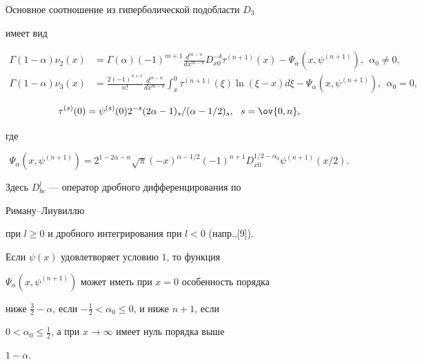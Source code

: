 \begin{lem} 


Основное соотношение из гиперболической подобласти $D_3$ 


имеет вид 


\begin{align*} 


\Gamma(1-\alpha)\nu_2(x)&=\Gamma(\alpha)(-1)^{m+1} 


\frac{d^{m-n}}{dx^{m-n}}D^{-\delta}_{x0}\tau^{(n+1)}(x) 


-\Psi_\alpha(x,\psi^{(n+1)}),\ \ \alpha_0\ne0,\\ 


% 


\Gamma(1-\alpha)\nu_3(x)&=\frac{2(-1)^{n+1}}{n!} 


\frac{d^{m-n}}{dx^{m-n}}\int^0_x \tau^{(n+1)}(\xi) 


\ln(\xi-x)d\xi-\Psi_\alpha(x,\psi^{(n+1)}),\ \ \alpha_0=0, 


\end{align*} 


$$ 


\tau^{(s)}(0)=\psi^{(s)}(0)2^{-s}(2\alpha-1)_s/(\alpha-1/2)_s, 


\ \ s=\ov{0,n}, 


$$ 


где 


$$ 


\Psi_\alpha(x,\psi^{(n+1)})=2^{1-2\alpha-n} 


\sqrt{\pi}(-x)^{\alpha-1/2}(-1)^{n+1} 


D^{1/2-\alpha_0}_{x0}\psi^{(n+1)}(x/2). 


$$ 


\end{lem} 


 


Здесь $D^l_{bc}$ --- оператор дробного дифференцирования по 


Риману--Лиувиллю 


при $l\ge0$ и дробного интегрирования при $l<0$ (напр.,[9]). 


 


 


\begin{lem} 


Если $\psi(x)$ удовлетворяет условию $1$, то функция 


$\Psi_\alpha(x,\psi^{(n+1)})$ может иметь при $x=0$ особенность порядка 


ниже $\frac32-\alpha$, если $-\frac12<\alpha_0\le0$, и ниже $n+1$, если 


$0<\alpha_0\le\frac12$, а при $x\to\infty$ имеет нуль порядка выше 


$1-\alpha$. 


\end{lem} 


